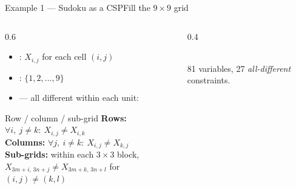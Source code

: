 \documentclass[aspectratio=169,11pt]{beamer}
\begin{document}
\begin{frame}{Example 1 — Sudoku as a CSP}{Fill the $9\times9$ grid}
  \begin{columns}[T]
    \begin{column}{0.6\textwidth}
      \begin{itemize}\small
        \item {}: $X_{i,j}$ for each cell $(i,j)$
        \item {}: $\{1,2,\dots,9\}$
        \item {} — all different within each unit:
      \end{itemize}
      \small
      \begin{block}{Row / column / sub-grid}
        \footnotesize
        \textbf{Rows:} $\forall i,\ j\neq k:\ X_{i,j}\neq X_{i,k}$ \\[0.2em]
        \textbf{Columns:} $\forall j,\ i\neq k:\ X_{i,j}\neq X_{k,j}$ \\[0.2em]
        \textbf{Sub-grids:} within each $3\times3$ block, \\
        \quad $X_{3m+i,\,3n+j}\neq X_{3m+k,\,3n+l}$ for $(i,j)\neq(k,l)$
      \end{block}
    \end{column}
    \begin{column}{0.4\textwidth}
      \begin{center}
      \\[0.3em]
      \scriptsize 81 variables, 27 \emph{all-different} constraints.
      \end{center}
    \end{column}
  \end{columns}
\end{frame}
\end{document}
